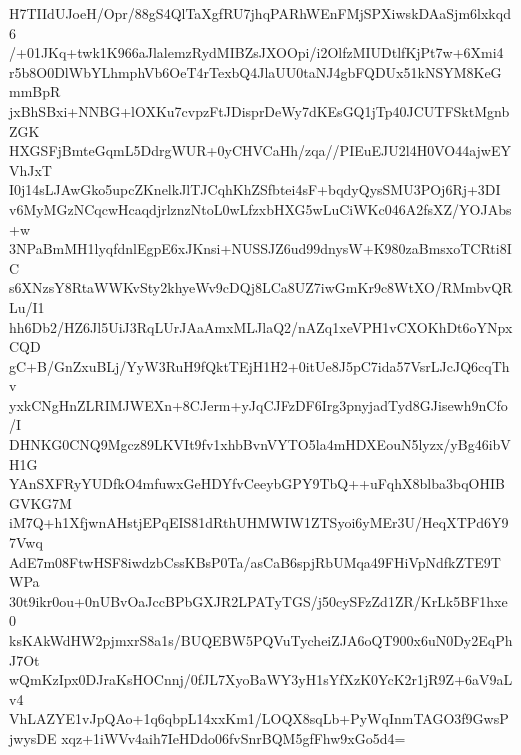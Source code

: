 H7TIIdUJoeH/Opr/88gS4QlTaXgfRU7jhqPARhWEnFMjSPXiwskDAaSjm6lxkqd6
/+01JKq+twk1K966aJlalemzRydMIBZsJXOOpi/i2OlfzMIUDtlfKjPt7w+6Xmi4
r5b8O0DlWbYLhmphVb6OeT4rTexbQ4JlaUU0taNJ4gbFQDUx51kNSYM8KeGmmBpR
jxBhSBxi+NNBG+lOXKu7cvpzFtJDisprDeWy7dKEsGQ1jTp40JCUTFSktMgnbZGK
HXGSFjBmteGqmL5DdrgWUR+0yCHVCaHh/zqa//PIEuEJU2l4H0VO44ajwEYVhJxT
I0j14sLJAwGko5upcZKnelkJlTJCqhKhZSfbtei4sF+bqdyQysSMU3POj6Rj+3DI
v6MyMGzNCqcwHcaqdjrlznzNtoL0wLfzxbHXG5wLuCiWKc046A2fsXZ/YOJAbs+w
3NPaBmMH1lyqfdnlEgpE6xJKnsi+NUSSJZ6ud99dnysW+K980zaBmsxoTCRti8IC
s6XNzsY8RtaWWKvSty2khyeWv9cDQj8LCa8UZ7iwGmKr9c8WtXO/RMmbvQRLu/I1
hh6Db2/HZ6Jl5UiJ3RqLUrJAaAmxMLJlaQ2/nAZq1xeVPH1vCXOKhDt6oYNpxCQD
gC+B/GnZxuBLj/YyW3RuH9fQktTEjH1H2+0itUe8J5pC7ida57VsrLJcJQ6cqThv
yxkCNgHnZLRIMJWEXn+8CJerm+yJqCJFzDF6Irg3pnyjadTyd8GJisewh9nCfo/I
DHNKG0CNQ9Mgcz89LKVIt9fv1xhbBvnVYTO5la4mHDXEouN5lyzx/yBg46ibVH1G
YAnSXFRyYUDfkO4mfuwxGeHDYfvCeeybGPY9TbQ++uFqhX8blba3bqOHIBGVKG7M
iM7Q+h1XfjwnAHstjEPqEIS81dRthUHMWIW1ZTSyoi6yMEr3U/HeqXTPd6Y97Vwq
AdE7m08FtwHSF8iwdzbCssKBsP0Ta/asCaB6spjRbUMqa49FHiVpNdfkZTE9TWPa
30t9ikr0ou+0nUBvOaJccBPbGXJR2LPATyTGS/j50cySFzZd1ZR/KrLk5BF1hxe0
ksKAkWdHW2pjmxrS8a1s/BUQEBW5PQVuTycheiZJA6oQT900x6uN0Dy2EqPhJ7Ot
wQmKzIpx0DJraKsHOCnnj/0fJL7XyoBaWY3yH1sYfXzK0YcK2r1jR9Z+6aV9aLv4
VhLAZYE1vJpQAo+1q6qbpL14xxKm1/LOQX8sqLb+PyWqInmTAGO3f9GwsPjwysDE
xqz+1iWVv4aih7IeHDdo06fvSnrBQM5gfFhw9xGo5d4=
